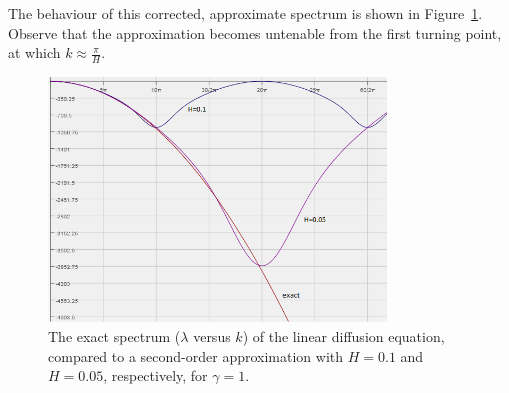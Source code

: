 \documentclass[12pt,a5paper]{article}
\begin{document}
The behaviour of this corrected, approximate spectrum is shown in Figure~\ref{fig:spec:2nd-order}.
Observe that the approximation becomes untenable from the first turning point, at which $k\approx\frac{\pi}{H}$.
\begin{figure}[hbt]
\centering
\includegraphics[width=0.8\textwidth]{figures/second-order-spectrum.png}
\caption{The exact spectrum ($\lambda$ versus $k$) of the linear diffusion equation, compared to a second-order approximation with $H=0.1$ and $H=0.05$, respectively, for $\gamma=1$.}
\label{fig:spec:2nd-order}
\end{figure}

\end{document}
